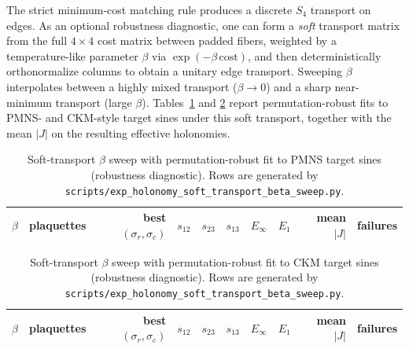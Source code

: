 The strict minimum-cost matching rule produces a discrete $S_4$ transport on edges.
As an optional robustness diagnostic, one can form a \emph{soft} transport matrix from the full $4\times 4$ cost matrix between padded fibers, weighted by a temperature-like parameter $\beta$ via $\exp(-\beta\,\mathrm{cost})$, and then deterministically orthonormalize columns to obtain a unitary edge transport.
Sweeping $\beta$ interpolates between a highly mixed transport ($\beta\to 0$) and a sharp near-minimum transport (large $\beta$).
Tables~\ref{tab:holonomy_soft_transport_pmns} and \ref{tab:holonomy_soft_transport_ckm} report permutation-robust fits to PMNS- and CKM-style target sines under this soft transport, together with the mean $|J|$ on the resulting effective holonomies.

\begin{table}[t]
\centering
\scriptsize
\setlength{\tabcolsep}{4pt}
\renewcommand{\arraystretch}{1.15}
\begin{tabular}{rrrrrrrrrr}
\toprule
$\beta$ & plaquettes & best $(\sigma_r,\sigma_c)$ & $s_{12}$ & $s_{23}$ & $s_{13}$ & $E_\infty$ & $E_1$ & mean $|J|$ & failures \\
\midrule
%
\end{tabular}
\caption{Soft-transport $\beta$ sweep with permutation-robust fit to PMNS target sines (robustness diagnostic). Rows are generated by \texttt{scripts/exp\_holonomy\_soft\_transport\_beta\_sweep.py}.}
\label{tab:holonomy_soft_transport_pmns}
\end{table}

\begin{table}[t]
\centering
\scriptsize
\setlength{\tabcolsep}{4pt}
\renewcommand{\arraystretch}{1.15}
\begin{tabular}{rrrrrrrrrr}
\toprule
$\beta$ & plaquettes & best $(\sigma_r,\sigma_c)$ & $s_{12}$ & $s_{23}$ & $s_{13}$ & $E_\infty$ & $E_1$ & mean $|J|$ & failures \\
\midrule
%
\end{tabular}
\caption{Soft-transport $\beta$ sweep with permutation-robust fit to CKM target sines (robustness diagnostic). Rows are generated by \texttt{scripts/exp\_holonomy\_soft\_transport\_beta\_sweep.py}.}
\label{tab:holonomy_soft_transport_ckm}
\end{table}


